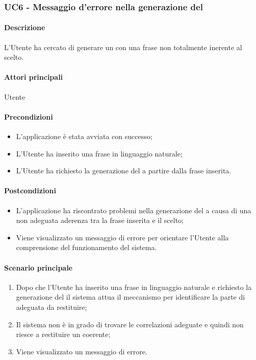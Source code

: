 \subsubsection{UC6 - Messaggio d'errore nella generazione del }\label{UC6}
\paragraph*{Descrizione}
L’Utente ha cercato di generare un  con una frase non totalmente inerente al  scelto.

\paragraph*{Attori principali}
Utente

\paragraph*{Precondizioni}
\begin{itemize}
  \item L'applicazione è stata avviata con successo;
  \item L’Utente ha inserito una frase in linguaggio naturale;
  \item L’Utente ha richiesto la generazione del  a partire dalla frase inserita.  
\end{itemize}

\paragraph*{Postcondizioni}
\begin{itemize}
  \item L’applicazione ha riscontrato problemi nella generazione del  a causa di una non adeguata aderenza tra la frase inserita e il  scelto;
  \item Viene visualizzato un messaggio di errore per orientare l’Utente alla comprensione del funzionamento del sistema.
\end{itemize}

\paragraph*{Scenario principale}
\begin{enumerate}
  \item Dopo che l’Utente ha inserito una frase in linguaggio naturale e richiesto la generazione del  il sistema attua il meccanismo per identificare la parte di  adeguata da restituire;
  \item Il sistema non è in grado di trovare le correlazioni adeguate e quindi non riesce a restituire un  coerente;
  \item Viene visualizzato un messaggio di errore.
\end{enumerate}
